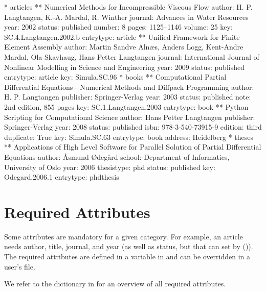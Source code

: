 \tiny
\begin{code}
* articles
** Numerical Methods for Incompressible Viscous Flow
   author:    H. P. Langtangen, K.-A. Mardal, R. Winther
   journal:   Advances in Water Resources
   year:      2002
   status:    published
   number:    8
   pages:     1125--1146
   volume:    25
   key:       SC.4.Langtangen.2002.b
   entrytype: article
** Unified Framework for Finite Element Assembly
   author:    Martin Sandve Aln{\ae}s, Anders Logg, Kent-Andre Mardal, Ola Skavhaug, Hans Petter Langtangen
   journal:   International Journal of Nonlinear Modelling in Science and Engineering
   year:      2009
   status:    published
   entrytype: article
   key:       Simula.SC.96
* books
** Computational Partial Differential Equations - Numerical Methods and Diffpack Programming
   author:    H. P. Langtangen
   publisher: Springer-Verlag
   year:      2003
   status:    published
   note:      2nd edition, 855 pages
   key:       SC.1.Langtangen.2003
   entrytype: book
** {P}ython Scripting for Computational Science
   author:    Hans Petter Langtangen
   publisher: Springer-Verlag
   year:      2008
   status:    published
   isbn:      978-3-540-73915-9
   edition:   third
   duplicate: True
   key:       Simula.SC.63
   entrytype: book
   address:   Heidelberg
* theses
** Applications of High Level Software for Parallel Solution of Partial Differential Equations
   author:     {\AA}smund {\O}deg{\aa}rd
   school:     Department of Informatics, University of Oslo
   year:       2006
   thesistype: phd
   status:     published
   key:        Odegard.2006.1
   entrytype:  phdthesis
\end{code}
\normalsize

\section{Required Attributes}

Some attributes are mandatory for a given category. For example,
an article needs author, title, journal, and year (as well as status,
but that can set by \package()). The required attributes are defined
in a variable  in
 and can be overridden in
a user's  file.

We refer to the  dictionary in
 for an overview of
all required attributes.
